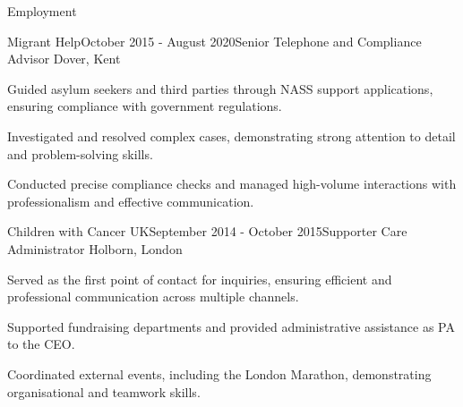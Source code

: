 \documentclass[
	11pt, %
]{resume} %
\begin{document}
\begin{rSection}{Employment}

	\begin{rSubsection}{Migrant Help}{October 2015 - August 2020}{Senior Telephone and Compliance Advisor }{Dover, Kent}
		\item Guided asylum seekers and third parties through NASS support applications, ensuring compliance
		with government regulations.
		\item Investigated and resolved complex cases, demonstrating strong attention to detail and
		problem-solving skills.
        \item Conducted precise compliance checks and managed high-volume interactions with professionalism
		and effective communication.
	\end{rSubsection}


	\begin{rSubsection}{Children with Cancer UK}{September 2014 - October 2015}{Supporter Care Administrator}
	{Holborn, London}
		\item Served as the first point of contact for inquiries, ensuring efficient and professional communication
		across multiple channels.
		\item Supported fundraising departments and provided administrative assistance as PA to the CEO.
        \item Coordinated external events, including the London Marathon, demonstrating organisational and
		teamwork skills.
	\end{rSubsection}
 
\end{rSection}

\end{document}

